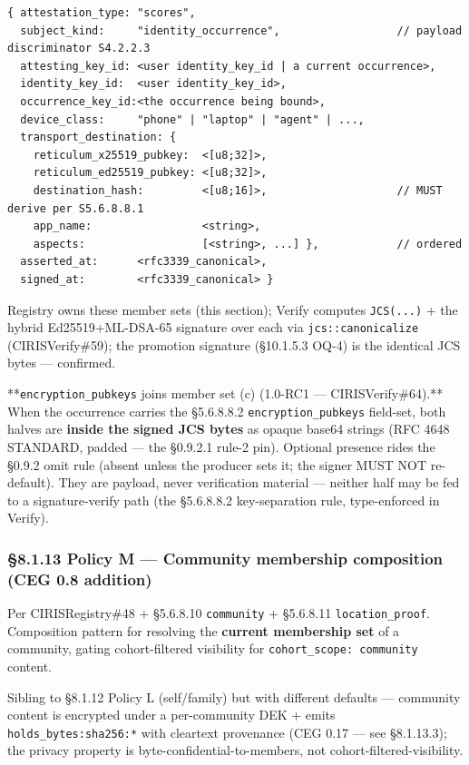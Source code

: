\documentclass[10pt]{article}
\begin{document}
\begin{lstlisting}
{ attestation_type: "scores",
  subject_kind:     "identity_occurrence",                  // payload discriminator S4.2.2.3
  attesting_key_id: <user identity_key_id | a current occurrence>,
  identity_key_id:  <user identity_key_id>,
  occurrence_key_id:<the occurrence being bound>,
  device_class:     "phone" | "laptop" | "agent" | ...,
  transport_destination: {
    reticulum_x25519_pubkey:  <[u8;32]>,
    reticulum_ed25519_pubkey: <[u8;32]>,
    destination_hash:         <[u8;16]>,                    // MUST derive per S5.6.8.8.1
    app_name:                 <string>,
    aspects:                  [<string>, ...] },            // ordered
  asserted_at:      <rfc3339_canonical>,
  signed_at:        <rfc3339_canonical> }
\end{lstlisting}

Registry owns these member sets (this section); Verify computes \texttt{JCS(...)} + the hybrid Ed25519+ML-DSA-65 signature over each via \texttt{jcs::canonicalize} (CIRISVerify\#59); the promotion signature (§10.1.5.3 OQ-4) is the identical JCS bytes — confirmed.


**\texttt{encryption\_pubkeys} joins member set (c) (1.0-RC1 — CIRISVerify\#64).** When the occurrence carries the §5.6.8.8.2 \texttt{encryption\_pubkeys} field-set, both halves are \textbf{inside the signed JCS bytes} as opaque base64 strings (RFC 4648 STANDARD, padded — the §0.9.2.1 rule-2 pin). Optional presence rides the §0.9.2 omit rule (absent unless the producer sets it; the signer MUST NOT re-default). They are payload, never verification material — neither half may be fed to a signature-verify path (the §5.6.8.8.2 key-separation rule, type-enforced in Verify).


\subsubsection*{§8.1.13 Policy M — Community membership composition (CEG 0.8 addition)}


Per CIRISRegistry\#48 + §5.6.8.10 \texttt{community} + §5.6.8.11 \texttt{location\_proof}. Composition pattern for resolving the \textbf{current membership set} of a community, gating cohort-filtered visibility for \texttt{cohort\_scope: community} content.


Sibling to §8.1.12 Policy L (self/family) but with different defaults — community content is encrypted under a per-community DEK + emits \texttt{holds\_bytes:sha256:*} with cleartext provenance (CEG 0.17 — see §8.1.13.3); the privacy property is byte-confidential-to-members, not cohort-filtered-visibility.
\end{document}
